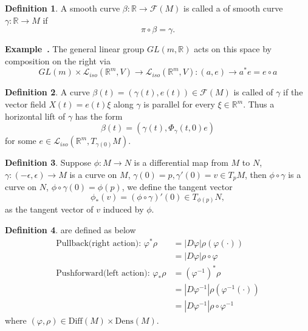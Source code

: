 \documentclass[a4paper]{article}
\theoremstyle{definition}
\newtheorem{definition}{Definition}
\theoremstyle{plain}
\newenvironment{example}[1][]{\refstepcounter{example}\par\medskip
   \noindent \textbf{Example~\theexample. #1} \rmfamily}{\medskip}
\newcounter{example}{Example}
\begin{document}
\begin{definition}
A smooth curve $\beta:\mathbb{R}\rightarrow\mathcal{F}(M)$ is called a  of smooth curve $\gamma:\mathbb{R}\rightarrow M$ if \cite{robbin}
\begin{equation*}
    \pi\circ\beta=\gamma.
\end{equation*}
\end{definition}

\begin{example}
The general linear group $GL(m,\mathbb{R})$ acts on this space by composition on the right via
\begin{equation*}
    GL(m)\times\mathcal{L}_{iso}(\mathbb{R}^m,V)\rightarrow\mathcal{L}_{iso}(\mathbb{R}^m,V):(a,e)\rightarrow a^*e=e\circ a
\end{equation*}
\end{example}

\begin{definition}
A curve $\beta(t)=(\gamma(t),e(t))\in\mathcal{F}(M)$ is called  of $\gamma$ if the vector field $X(t)=e(t)\xi$ along $\gamma$ is parallel for every $\xi\in\mathbb{R}^m$. Thus a horizontal lift of $\gamma$ has the form
\begin{equation*}
    \beta(t)=(\gamma(t),\Phi_\gamma(t,0)e)
\end{equation*}
for some $e\in\mathcal{L}_{iso}(\mathbb{R}^m,T_{\gamma(0)}M)$.
\end{definition}

\begin{definition}
Suppose $\phi:M\rightarrow N$ is a differential map from $M$ to $N$, $\gamma:(-\epsilon,\epsilon)\rightarrow M$ is a curve on $M$, $\gamma(0)=p,\gamma'(0)=v\in T_pM$, then $\phi\circ\gamma$ is a curve on $N$, $\phi\circ\gamma(0)=\phi(p)$, we define the tangent vector
\begin{equation*}
    \phi_*(v)=(\phi\circ\gamma)'(0)\in T_{\phi(p)}N,
\end{equation*}
as the  tangent vector of $v$ induced by $\phi$.
\end{definition}

\begin{definition}
 are defined as below
\begin{align*}
    \text{Pullback(right action):  }\varphi^*\rho&=|D\varphi|\rho(\varphi(\cdot))\\
    &=|D\varphi|\rho\circ\varphi\\
    \text{Pushforward(left action):  }\varphi_*\rho&=(\varphi^{-1})^*\rho\\
    &=|D\varphi^{-1}|\rho(\varphi^{-1}(\cdot))\\
    &=|D\varphi^{-1}|\rho\circ\varphi^{-1}
\end{align*}
where $(\varphi,\rho)\in\mathrm{Diff}(M)\times\mathrm{Dens}(M)$.
\end{definition}
\end{document}
